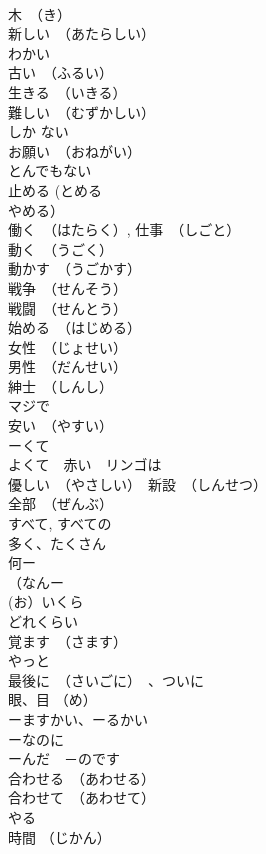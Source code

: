 \documentclass[8pt]{extreport}
\begin{document}
\begin{CJK}{UTF8}{min}
\\	木　（き）	
\\	新しい　（あたらしい）	
\\	わかい	
\\	古い　（ふるい）	
\\	生きる　（いきる）	
\\	難しい　（むずかしい）	
\\	しか ない	
\\	お願い　（おねがい）	
\\	とんでもない	
\\	止める (とめる 
\\	やめる）	
\\	働く　（はたらく）, 仕事　（しごと）	
\\	動く　（うごく）	
\\	動かす　（うごかす）	
\\	戦争　（せんそう）	
\\	戦闘　（せんとう）	
\\	始める　（はじめる）	
\\	女性　（じょせい）	
\\	男性　（だんせい）	
\\	紳士　（しんし）	
\\	マジで	
\\	安い　（やすい）	
\\	ーくて 
\\	よくて　赤い　リンゴは	
\\	優しい　（やさしい）　新設　（しんせつ）	
\\	全部　（ぜんぶ）	
\\	すべて, すべての	
\\	多く、たくさん	
\\	何ー
\\	（なんー
\\	(お）いくら	
\\	どれくらい	
\\	覚ます　（さます）	
\\	やっと	
\\	最後に　（さいごに）　、ついに	
\\	眼、目 （め）	
\\	ーますかい、ーるかい	
\\	ーなのに	
\\	ーんだ　－のです	
\\	合わせる　（あわせる）	
\\	合わせて　（あわせて）	
\\	やる	
\\	時間 （じかん）	

\end{CJK}
\end{document}
